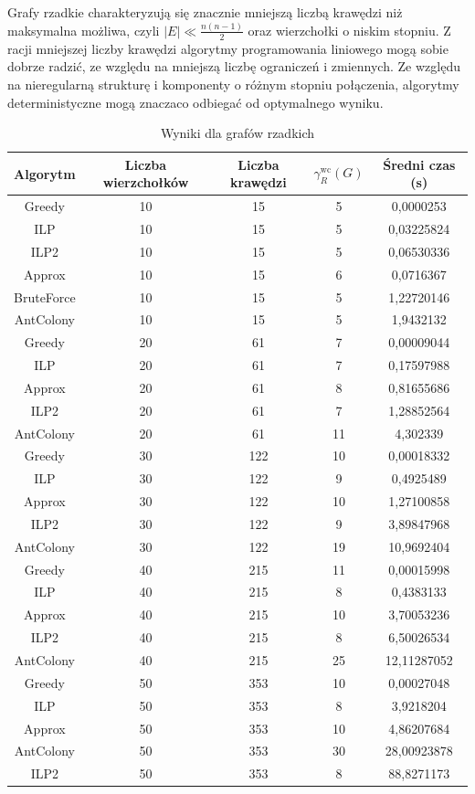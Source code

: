 Grafy rzadkie charakteryzują się znacznie mniejszą liczbą krawędzi niż maksymalna możliwa, czyli $|E| \ll \frac{n(n - 1)}{2}$ oraz wierzchołki o niskim stopniu. Z racji mniejszej liczby krawędzi algorytmy programowania liniowego mogą sobie dobrze radzić, ze względu na mniejszą liczbę ograniczeń i zmiennych. Ze względu na nieregularną strukturę i komponenty o różnym stopniu połączenia, algorytmy deterministyczne mogą znaczaco odbiegać od optymalnego wyniku.

\begin{table}[H]
    \centering
    \begin{tabular}{|c|c|c|c|c|}
    \hline
    Algorytm & Liczba wierzchołków & Liczba krawędzi & $\gamma^{\text{wc}}_R(G)$ & Średni czas (s) \\
    \hline
    Greedy	   & 10 &	15 &	5	 &   0,0000253	\\		
    ILP	       & 10 &	15 &	5	  &   0,03225824 \\
    ILP2	   & 10 &	15 &	5	  &   0,06530336 \\
    Approx	   & 10 &	15 &	6	  &   0,0716367 \\
    BruteForce & 10 &	15 &	5 	 &   1,22720146 \\
    AntColony & 10 &	15 &	5 	 &   1,9432132 \\
    \hline
    Greedy     &  20 & 61 & 7    &  0,00009044 \\     
    ILP        &  20 & 61 & 7    &   0,17597988 \\
    Approx     &  20 & 61 & 8    &    0,81655686 \\   
    ILP2       &  20 & 61 & 7    &   1,28852564 \\    
    AntColony  &  20 & 61 & 11   &   4,302339 \\         
    \hline
    Greedy & 30 & 122 & 10 & 0,00018332 \\
    ILP & 30 & 122 & 9 & 0,4925489 \\
    Approx & 30 & 122 & 10 & 1,27100858 \\
    ILP2 & 30 & 122 & 9 & 3,89847968 \\
    AntColony & 30 & 122 & 19 & 10,9692404 \\
    \hline
    Greedy & 40 & 215 & 11 & 0,00015998 \\
    ILP & 40 & 215 & 8 & 0,4383133 \\
    Approx & 40 & 215 & 10 & 3,70053236 \\
    ILP2 & 40 & 215 & 8 & 6,50026534 \\
    AntColony & 40 & 215 & 25 & 12,11287052 \\
    \hline
    Greedy & 50 & 353 & 10 & 0,00027048 \\
    ILP & 50 & 353 & 8 & 3,9218204 \\
    Approx & 50 & 353 & 10 & 4,86207684 \\
    AntColony & 50 & 353 & 30 & 28,00923878 \\
    ILP2 & 50 & 353 & 8 & 88,8271173 \\   
    \hline
    \end{tabular}
    \caption{Wyniki dla grafów rzadkich}
    \end{table}

